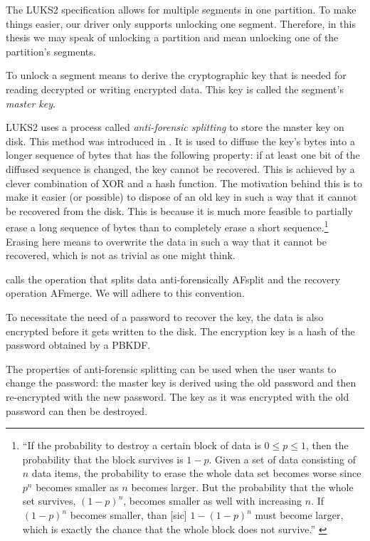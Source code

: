 The LUKS2 specification allows for multiple segments in one partition. To make things easier, our driver only supports unlocking one segment. Therefore, in this thesis we may speak of unlocking a partition and mean unlocking one of the partition's segments.

To unlock a segment means to derive the cryptographic key that is needed for reading decrypted or writing encrypted data. This key is called the segment's \emph{master key}.

LUKS2 uses a process called \emph{anti-forensic splitting} to store the master key on disk. This method was introduced in \cite{Fruhwirth2005}. It is used to diffuse the key's bytes into a longer sequence of bytes that has the following property: if at least one bit of the diffused sequence is changed, the key cannot be recovered. This is achieved by a clever combination of XOR and a hash function. The motivation behind this is to make it easier (or possible) to dispose of an old key in such a way that it cannot be recovered from the disk. This is because it is much more feasible to partially erase a long sequence of bytes than to completely erase a short sequence.\footnote{\label{fn:background.luks2.blockerasure} ``If the probability to destroy a certain block of data is $0 \le p \le 1$, then the probability that the block survives is $1 - p$. Given a set of data consisting of $n$ data items, the probability to erase the whole data set becomes worse since $p^n$ becomes smaller as $n$ becomes larger. But the probability that the whole set survives, $(1 - p)^n$, becomes smaller as well with increasing $n$. If $(1 - p)^n$ becomes smaller, than [sic] $1 - (1 - p)^n$ must become larger, which is exactly the chance that the whole block does not survive.'' \cite{Fruhwirth2005}} Erasing here means to overwrite the data in such a way that it cannot be recovered, which is not as trivial as one might think.

\cite{Fruhwirth2005} calls the operation that splits data anti-forensically AFsplit and the recovery operation AFmerge. We will adhere to this convention.

To necessitate the need of a password to recover the key, the data is also encrypted before it gets written to the disk. The encryption key is a hash of the password obtained by a PBKDF.

The properties of anti-forensic splitting can be used when the user wants to change the password: the master key is derived using the old password and then re-encrypted with the new password. The key as it was encrypted with the old password can then be destroyed.

